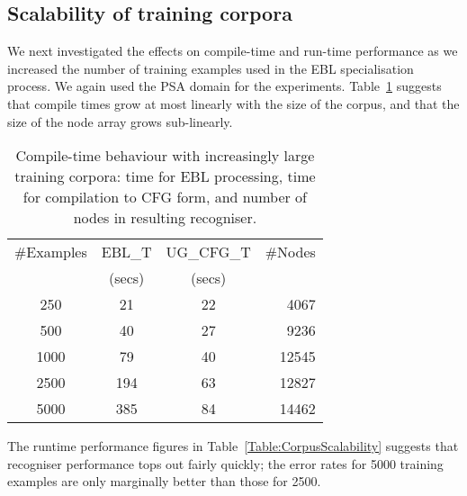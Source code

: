 \documentclass[11pt]{article}
\begin{document}
\subsection{Scalability of training corpora}
\label{Section:CorpusScalability}

We next investigated the effects on compile-time and run-time
performance as we increased the number of training examples used in
the EBL specialisation process. We again used the PSA domain for the
experiments. Table~\ref{Table:CorpusScalabilityCompileTime} suggests
that compile times grow at most linearly with the size of the corpus,
and that the size of the node array grows sub-linearly.

\begin{table}[h]
\begin{tabular}{|c||c|c|r|}
\hline
\#Examples 	&EBL\_T		&UG\_CFG\_T	&\#Nodes\\
		&(secs)		&(secs)		&	\\
\hline	
\hline	
250		&21		&22		&4067	\\
\hline
500		&40		&27		&9236	\\
\hline
1000		&79		&40		&12545	\\
\hline
2500		&194		&63		&12827	\\
\hline
5000		&385		&84		&14462	\\
\hline
\end{tabular}
\caption{Compile-time behaviour with increasingly large training
corpora: time for EBL processing, time for compilation to CFG form,
and number of nodes in resulting recogniser.}
\label{Table:CorpusScalabilityCompileTime}
\end{table}

The runtime performance figures in
Table~\ref{Table:CorpusScalability} suggests that recogniser performance
tops out fairly quickly; the error rates for 5000 training examples
are only marginally better than those for 2500.
\end{document}
